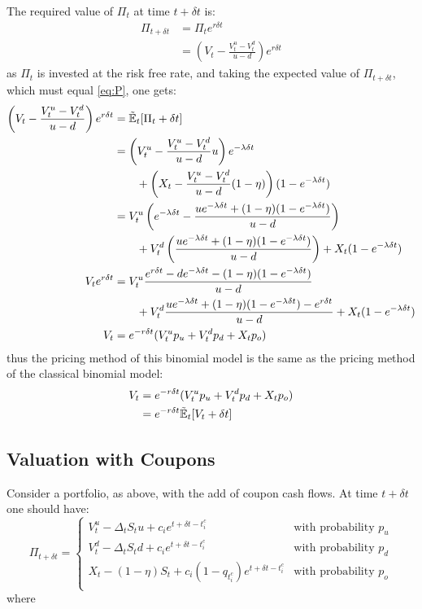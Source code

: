 \documentclass[a4paper,11pt,oneside]{report}
\theoremstyle{plain}
\theoremstyle{definition}
\def\n{\nonumber\\}
\def\Et[#1]{\Tilde{\mathbb{E}}_t\!\left[#1\right]}
\def\S{\ensuremath{S_t}\xspace}
\def\Dt{\ensuremath{\delta t}\xspace}
\def\u{\ensuremath{u}\xspace}
\def\d{\ensuremath{d}\xspace}
\def\o{\ensuremath{o}\xspace}
\def\pu{\ensuremath{p_\u}\xspace}
\def\pd{\ensuremath{p_\d}\xspace}
\def\po{\ensuremath{p_\o}\xspace}
\def\V{\ensuremath{V_t}\xspace}
\def\Vu{\ensuremath{V^{u}_t}\xspace}
\def\Vd{\ensuremath{V^{d}_t}\xspace}
\def\X{\ensuremath{X_t}\xspace}
\def\P{\ensuremath{\Pi_t}\xspace}
\def\D{\ensuremath{\Delta_t}\xspace}
\begin{document}
The required value of \P at time $t + \Dt$ is:
\begin{align}
 \Pi_{t + \Dt}  &= \P e^{r\Dt} \n
                &= \left(\V - \frac{\Vu - \Vd}{u - d}\right) e^{r\Dt} \label{eq:P}
\end{align}
as \P is invested at the risk free rate, and taking the expected value of $\Pi_{t + \Dt}$, which must equal \eqref{eq:P}, one gets:
\begin{align}
 \left(\V - \frac{\Vu - \Vd}{u - d}\right) e^{r\Dt} &= \Et[\Pi_{t + \Dt}] \n
        &= \left(\Vu - \frac{\Vu - \Vd}{u - d}u\right) e^{-\lambda\Dt} \n
        &\qquad + \left(\X - \frac{\Vu - \Vd}{u - d}(1 - \eta)\right)(1 - e^{-\lambda\Dt}) \n
        &= \Vu\left(e^{-\lambda\Dt} - \frac{ue^{-\lambda\Dt} + (1 - \eta)(1 - e^{-\lambda\Dt})}{u - d}\right) \n
        &\qquad + \Vd\left(\frac{ue^{-\lambda\Dt} + (1 - \eta)(1 - e^{-\lambda\Dt})}{u - d}\right) + \X(1 - e^{-\lambda\Dt}) \n
 \V e^{r\Dt} &= \Vu\frac{e^{r\Dt} - de^{-\lambda\Dt} - (1 - \eta)(1 - e^{-\lambda\Dt})}{u - d} \n
        &\qquad + \Vd\frac{ue^{-\lambda\Dt} + (1 - \eta)(1 - e^{-\lambda\Dt}) - e^{r\Dt}}{u - d} + \X(1 - e^{-\lambda\Dt}) \n
 \V     &= e^{-r\Dt}(\Vu\pu + \Vd\pd + \X\po)
\end{align}
thus the pricing method of this binomial model is the same as the pricing method of the classical binomial model:
\begin{align}
 V_t    &= e^{-r\Dt}(\Vu\pu + \Vd\pd + \X\po) \n
        &= e^{-r\Dt}\Et[V_{t + \Dt}]
\end{align}


\subsection{Valuation with Coupons}
Consider a portfolio, as above, with the add of coupon cash flows.  At time $t + \Dt$ one should have:
\begin{equation*}
 \Pi_{t + \Dt} =
 \begin{cases}
  \Vu - \D\S u + c_i e^{t + \Dt - t^{c}_i}      & \text{with probability } \pu \\
  \Vd - \D\S d + c_i e^{t + \Dt - t^{c}_i}      & \text{with probability } \pd\\
  \X - (1 - \eta)\S + c_i (1 - q_{t^{c}_i})e^{t + \Dt - t^{c}_i} & \text{with probability } \po\\
 \end{cases}
\end{equation*}
where
\end{document}
